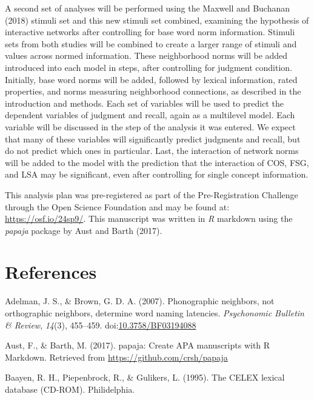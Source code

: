 \documentclass[english,man]{apa6}
\theoremstyle{definition}
\theoremstyle{definition}
\theoremstyle{definition}
\theoremstyle{remark}
\begin{document}
A second set of analyses will be performed using the Maxwell and
Buchanan (2018) stimuli set and this new stimuli set combined, examining
the hypothesis of interactive networks after controlling for base word
norm information. Stimuli sets from both studies will be combined to
create a larger range of stimuli and values across normed information.
These neighborhood norms will be added introduced into each model in
steps, after controlling for judgment condition. Initially, base word
norms will be added, followed by lexical information, rated properties,
and norms measuring neighborhood connections, as described in the
introduction and methods. Each set of variables will be used to predict
the dependent variables of judgment and recall, again as a multilevel
model. Each variable will be discussed in the step of the analysis it
was entered. We expect that many of these variables will significantly
predict judgments and recall, but do not predict which ones in
particular. Last, the interaction of network norms will be added to the
model with the prediction that the interaction of COS, FSG, and LSA may
be significant, even after controlling for single concept information.

This analysis plan was pre-registered as part of the Pre-Registration
Challenge through the Open Science Foundation and may be found at:
\url{https://osf.io/24sp9/}. This manuscript was written in \emph{R}
markdown using the \emph{papaja} package by Aust and Barth (2017).

\newpage

\section{References}\label{references}

\setlength{\parindent}{-0.5in} \setlength{\leftskip}{0.5in}

\hypertarget{refs}{}
\hypertarget{ref-Adelman2007}{}
Adelman, J. S., \& Brown, G. D. A. (2007). Phonographic neighbors, not
orthographic neighbors, determine word naming latencies.
\emph{Psychonomic Bulletin \& Review}, \emph{14}(3), 455--459.
doi:\href{https://doi.org/10.3758/BF03194088}{10.3758/BF03194088}

\hypertarget{ref-Aust2017}{}
Aust, F., \& Barth, M. (2017). papaja: Create APA manuscripts with R
Markdown. Retrieved from \url{https://github.com/crsh/papaja}

\hypertarget{ref-Baayen1995}{}
Baayen, R. H., Piepenbrock, R., \& Gulikers, L. (1995). The CELEX
lexical database (CD-ROM). Philidelphia.
\end{document}
